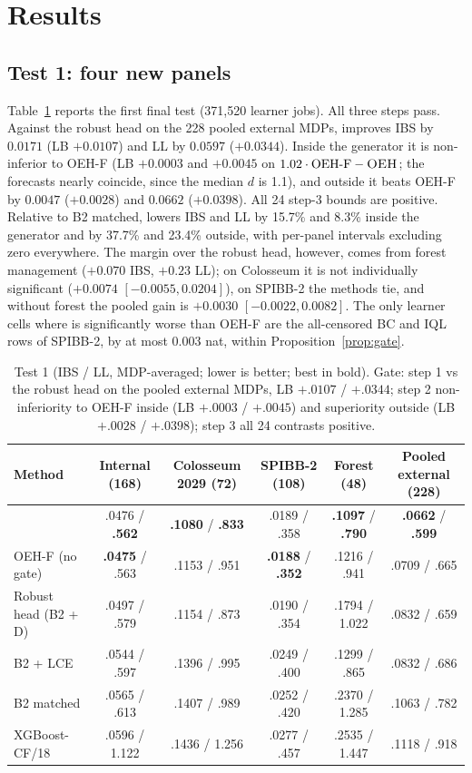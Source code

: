 \section{Results}
\label{sec:results}

\subsection{Test 1: four new panels}
\label{sec:v2test}
Table~\ref{tab:v2test} reports the first final test (371{,}520 learner jobs). All three steps pass. Against the robust head on the 228 pooled external MDPs, \OEH{} improves IBS by $0.0171$ (LB $+0.0107$) and LL by $0.0597$ ($+0.0344$). Inside the generator it is non-inferior to OEH-F (LB $+0.0003$ and $+0.0045$ on $1.02\cdot\text{OEH-F}-\textsc{OEH}{}$; the forecasts nearly coincide, since the median $d$ is 1.1), and outside it beats OEH-F by $0.0047$ ($+0.0028$) and $0.0662$ ($+0.0398$). All 24 step-3 bounds are positive. Relative to B2 matched, \OEH{} lowers IBS and LL by 15.7\% and 8.3\% inside the generator and by 37.7\% and 23.4\% outside, with per-panel intervals excluding zero everywhere. The margin over the robust head, however, comes from forest management ($+0.070$ IBS, $+0.23$ LL); on Colosseum it is not individually significant ($+0.0074$ $[-0.0055,0.0204]$), on SPIBB-2 the methods tie, and without forest the pooled gain is $+0.0030$ $[-0.0022,0.0082]$. The only learner cells where \OEH{} is significantly worse than OEH-F are the all-censored BC and IQL rows of SPIBB-2, by at most 0.003 nat, within Proposition~\ref{prop:gate}.

\begin{table}[t]
\centering
\caption{Test 1 (IBS / LL, MDP-averaged; lower is better; best in bold). Gate: step 1 vs the robust head on the pooled external MDPs, LB $+.0107$ / $+.0344$; step 2 non-inferiority to OEH-F inside (LB $+.0003$ / $+.0045$) and superiority outside (LB $+.0028$ / $+.0398$); step 3 all 24 contrasts positive.}
\label{tab:v2test}
\footnotesize
\setlength{\tabcolsep}{4pt}
\begin{tabular}{@{}lccccc@{}}
\toprule
Method & Internal (168) & Colosseum 2029 (72) & SPIBB-2 (108) & Forest (48) & Pooled external (228)\\
\midrule
\OEH{} & .0476 / \textbf{.562} & \textbf{.1080} / \textbf{.833} & .0189 / .358 & \textbf{.1097} / \textbf{.790} & \textbf{.0662} / \textbf{.599}\\
OEH-F (no gate) & \textbf{.0475} / .563 & .1153 / .951 & \textbf{.0188} / \textbf{.352} & .1216 / .941 & .0709 / .665\\
Robust head (B2 + D) & .0497 / .579 & .1154 / .873 & .0190 / .354 & .1794 / 1.022 & .0832 / .659\\
B2 + LCE & .0544 / .597 & .1396 / .995 & .0249 / .400 & .1299 / .865 & .0832 / .686\\
B2 matched & .0565 / .613 & .1407 / .989 & .0252 / .420 & .2370 / 1.285 & .1063 / .782\\
XGBoost-CF/18 & .0596 / 1.122 & .1436 / 1.256 & .0277 / .457 & .2535 / 1.447 & .1118 / .918\\
\bottomrule
\end{tabular}
\end{table}

